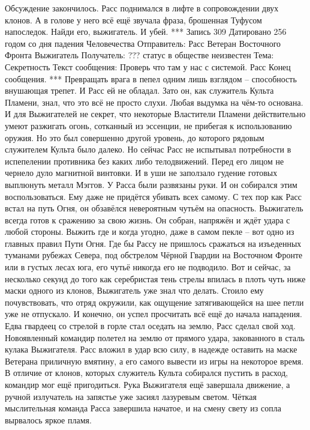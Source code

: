 \documentclass[a4paper, 12pt]{report}
\begin{document}
Обсуждение закончилось. Расс поднимался в лифте в сопровождении двух клонов. А в голове у него всё ещё звучала фраза, брошенная Туфусом напоследок.
Найди его, выжигатель.
И убей.
***
Запись 309
Датировано 256 годом со дня падения Человечества
Отправитель: Расс Ветеран Восточного Фронта Выжигатель
Получатель: ??? статус в обществе неизвестен
Тема: Секретность
Текст сообщения:	
	Проверь что там у нас с системой.
Расс
Конец сообщения. 
***
	Превращать врага в пепел одним лишь взглядом – способность внушающая трепет. И Расс ей не обладал. Зато он, как служитель Культа Пламени, знал, что это всё не просто слухи. Любая выдумка на чём-то основана. И для Выжигателей не секрет, что некоторые Властители Пламени действительно умеют разжигать огонь, сотканный из эссенции, не прибегая к использованию оружия. Но это был совершенно другой уровень, до которого рядовым служителем Культа было далеко.  
	Но сейчас Расс не испытывал потребности в испепелении противника без каких либо телодвижений. Перед его лицом не чернело дуло магнитной винтовки. И в уши не заползало гудение готовых выплюнуть металл Мэггов. У Расса были развязаны руки. И он собирался этим воспользоваться.
	Ему даже не придётся убивать всех самому.
	С тех пор как Расс встал на путь Огня, он обзавёлся невероятным чутьём на опасность. Выжигатель всегда готов к сражению за свою жизнь. Он собран, напряжён и ждёт удара с любой стороны. Выжить где и когда угодно, даже в самом пекле – вот одно из главных правил Пути Огня.
	Где бы Рассу не пришлось сражаться на изъеденных туманами рубежах Севера, под обстрелом Чёрной Гвардии на Восточном Фронте или в густых лесах юга, его чутьё никогда его не подводило.
	Вот и сейчас, за несколько секунд до того как серебристая тень стрелы впилась в плоть чуть ниже маски одного из клонов, Выжигатель уже знал что делать. Стоило ему почувствовать, что отряд окружили, как ощущение затягивающейся на шее петли уже не отпускало. И конечно, он успел просчитать всё ещё до начала нападения.
	Едва гвардеец со стрелой в горле стал оседать на землю, Расс сделал свой ход. Новоявленный командир полетел на землю от прямого удара, закованного в сталь кулака Выжигателя. Расс вложил в удар всю силу, в надежде оставить на маске Ветерана приличную вмятину, а его самого вывести из игры на некоторое время. В отличие от клонов, которых служитель Культа собирался пустить в расход, командир мог ещё пригодиться.
	Рука Выжигателя ещё завершала движение, а ручной излучатель на запястье уже засиял лазуревым светом. Чёткая мыслительная команда Расса завершила начатое, и на смену свету из сопла вырвалось яркое пламя. 
\end{document}
